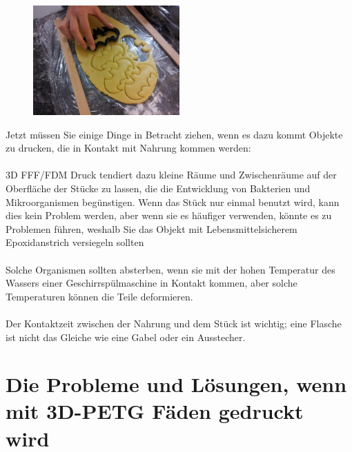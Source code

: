 \documentclass[11pt,a4paper]{article}
\begin{document}
\begin{figure}[H]
\centering
\includegraphics[width=0.5\textwidth,cfbox=azul_marcos 1pt 0pt]{FOTOS/CORTADORGALLETAS}
\end{figure}
Jetzt müssen Sie einige Dinge in Betracht ziehen, wenn es dazu kommt Objekte zu drucken, die in Kontakt mit Nahrung kommen werden:
\\\\
3D FFF/FDM Druck tendiert dazu kleine Räume und Zwischenräume auf der Oberfläche der Stücke zu lassen, die die Entwicklung von Bakterien und Mikroorganismen begünstigen. Wenn das Stück nur einmal benutzt wird, kann dies kein Problem werden, aber wenn sie es häufiger verwenden, könnte es zu Problemen führen, weshalb Sie das Objekt mit Lebensmittelsicherem Epoxidanstrich versiegeln sollten 
\\\\
Solche Organismen sollten absterben, wenn sie mit der hohen Temperatur des Wassers einer Geschirrspülmaschine in Kontakt kommen, aber solche Temperaturen können die Teile deformieren.
\\\\
Der Kontaktzeit zwischen der Nahrung und dem Stück ist wichtig; eine Flasche ist nicht das Gleiche wie eine Gabel oder ein Ausstecher.
\section{Die Probleme und Lösungen, wenn mit 3D-PETG Fäden gedruckt wird}
\end{document}
